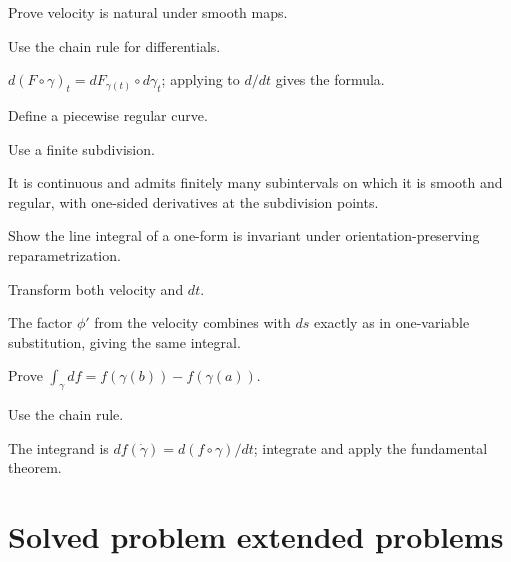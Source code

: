 \begin{exercise}\label{exr:vii12-21}
Prove velocity is natural under smooth maps.
\end{exercise}
\begin{hint}
Use the chain rule for differentials.
\end{hint}
\begin{solution}
$d(F\circ\gamma)_t=dF_{\gamma(t)}\circ d\gamma_t$; applying to $d/dt$ gives the formula.
\end{solution}

\begin{exercise}\label{exr:vii12-22}
Define a piecewise regular curve.
\end{exercise}
\begin{hint}
Use a finite subdivision.
\end{hint}
\begin{solution}
It is continuous and admits finitely many subintervals on which it is smooth and regular, with one-sided derivatives at the subdivision points.
\end{solution}

\begin{exercise}\label{exr:vii12-23}
Show the line integral of a one-form is invariant under orientation-preserving reparametrization.
\end{exercise}
\begin{hint}
Transform both velocity and $dt$.
\end{hint}
\begin{solution}
The factor $\phi'$ from the velocity combines with $ds$ exactly as in one-variable substitution, giving the same integral.
\end{solution}

\begin{exercise}\label{exr:vii12-24}
Prove $\int_\gamma df=f(\gamma(b))-f(\gamma(a))$.
\end{exercise}
\begin{hint}
Use the chain rule.
\end{hint}
\begin{solution}
The integrand is $df(\dot\gamma)=d(f\circ\gamma)/dt$; integrate and apply the fundamental theorem.
\end{solution}


\section{Solved problem extended problems}

